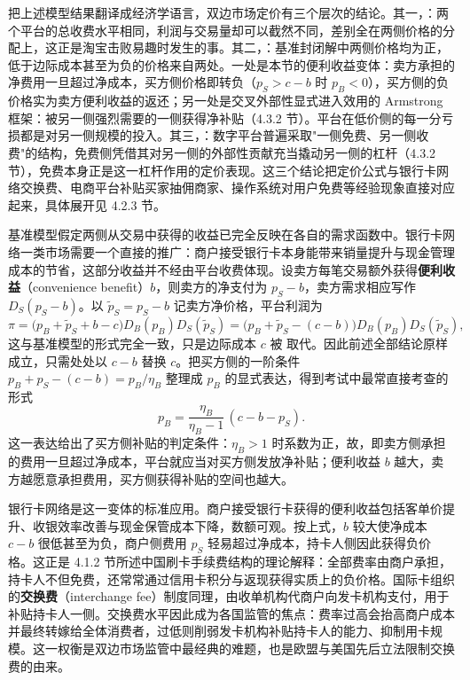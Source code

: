 把上述模型结果翻译成经济学语言，双边市场定价有三个层次的结论。其一，：两个平台的总收费水平相同，利润与交易量却可以截然不同，差别全在两侧价格的分配上，这正是淘宝击败易趣时发生的事。其二，：基准封闭解中两侧价格均为正，低于边际成本甚至为负的价格来自两处。一处是本节的便利收益变体：卖方承担的净费用一旦超过净成本，买方侧价格即转负（$p_S > c-b$ 时 $p_B < 0$），买方侧的负价格实为卖方便利收益的返还；另一处是交叉外部性显式进入效用的 Armstrong 框架：被另一侧强烈需要的一侧获得净补贴（4.3.2 节）。平台在低价侧的每一分亏损都是对另一侧规模的投入。其三，：数字平台普遍采取"一侧免费、另一侧收费"的结构，免费侧凭借其对另一侧的外部性贡献充当撬动另一侧的杠杆（4.3.2 节），免费本身正是这一杠杆作用的定价表现。这三个结论把定价公式与银行卡网络交换费、电商平台补贴买家抽佣商家、操作系统对用户免费等经验现象直接对应起来，具体展开见 4.2.3 节。

基准模型假定两侧从交易中获得的收益已完全反映在各自的需求函数中。银行卡网络一类市场需要一个直接的推广：商户接受银行卡本身能带来销量提升与现金管理成本的节省，这部分收益并不经由平台收费体现。设卖方每笔交易额外获得\textbf{便利收益}（convenience benefit）$b$，则卖方的净支付为 $p_S - b$，卖方需求相应写作 $D_S(p_S - b)$。以 $\tilde p_S = p_S - b$ 记卖方净价格，平台利润为
\[
\pi = \bigl(p_B + \tilde p_S + b - c\bigr)D_B(p_B)D_S(\tilde p_S) = \bigl(p_B + \tilde p_S - (c - b)\bigr)D_B(p_B)D_S(\tilde p_S),
\]
这与基准模型的形式完全一致，只是边际成本 $c$ 被 取代。因此前述全部结论原样成立，只需处处以 $c-b$ 替换 $c$。把买方侧的一阶条件 $p_B + p_S - (c-b) = p_B/\eta_B$ 整理成 $p_B$ 的显式表达，得到考试中最常直接考查的形式
\[
p_B = \frac{\eta_B}{\eta_B - 1}\,(c - b - p_S).
\]
这一表达给出了买方侧补贴的判定条件：$\eta_B > 1$ 时系数为正，故，即卖方侧承担的费用一旦超过净成本，平台就应当对买方侧发放净补贴；便利收益 $b$ 越大，卖方越愿意承担费用，买方侧获得补贴的空间也越大。

银行卡网络是这一变体的标准应用。商户接受银行卡获得的便利收益包括客单价提升、收银效率改善与现金保管成本下降，数额可观。按上式，$b$ 较大使净成本 $c-b$ 很低甚至为负，商户侧费用 $p_S$ 轻易超过净成本，持卡人侧因此获得负价格。这正是 4.1.2 节所述中国刷卡手续费结构的理论解释：全部费率由商户承担，持卡人不但免费，还常常通过信用卡积分与返现获得实质上的负价格。国际卡组织的\textbf{交换费}（interchange fee）制度同理，由收单机构代商户向发卡机构支付，用于补贴持卡人一侧。交换费水平因此成为各国监管的焦点：费率过高会抬高商户成本并最终转嫁给全体消费者，过低则削弱发卡机构补贴持卡人的能力、抑制用卡规模。这一权衡是双边市场监管中最经典的难题，也是欧盟与美国先后立法限制交换费的由来。

